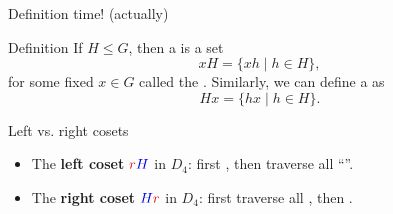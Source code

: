 \documentclass[8pt, handout]{beamer}
\newcommand{\Pause}{\pause}      %
\begin{document}
\begin{frame}{Definition time! (actually)}
  
  \begin{block}{Definition}
    If $H\leq G$, then a  is a set
    \[
    xH=\big\{xh\mid h\in H\big\},
    \]
    for some fixed $x\in G$ called the . \Pause
    Similarly, we can define a  as
    \[
    Hx=\big\{hx\mid h\in H\big\}.
    \]
  \end{block} \Pause
  \begin{exampleblock}{Left vs. right cosets}
    \begin{itemize}
      \item The \textbf{left coset} $\Alert{r}\Balert{H}$ in $D_4$: first
        , then traverse all
        ``''. \smallskip\Pause
      \item The \textbf{right coset} $\Balert{H}\Alert{r}$ in $D_4$:
        first traverse all , then .
      \end{itemize}
  \end{exampleblock}
  
  \medskip\Pause
  

\end{frame}
\end{document}
